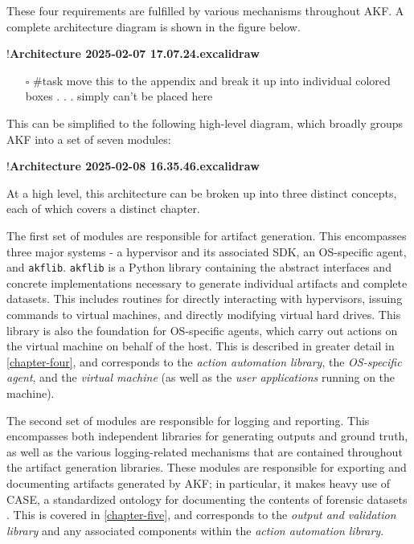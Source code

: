 \documentclass[letterpaper,12pt]{report}
\def\tightlist{}
\newcommand{\passthrough}[1]{#1}
\begin{document}
These four requirements are fulfilled by various mechanisms throughout
AKF. A complete architecture diagram is shown in the figure below.

!\textbf{Architecture 2025-02-07 17.07.24.excalidraw}

\begin{itemize}
\tightlist
\item[$\square$]
  \#task move this to the appendix and break it up into individual
  colored boxes . . . simply can't be placed here
\end{itemize}

This can be simplified to the following high-level diagram, which
broadly groups AKF into a set of seven modules:

!\textbf{Architecture 2025-02-08 16.35.46.excalidraw}

At a high level, this architecture can be broken up into three distinct
concepts, each of which covers a distinct chapter.

The first set of modules are responsible for artifact generation. This
encompasses three major systems - a hypervisor and its associated SDK,
an OS-specific agent, and \passthrough{\lstinline!akflib!}.
\passthrough{\lstinline!akflib!} is a Python library containing the
abstract interfaces and concrete implementations necessary to generate
individual artifacts and complete datasets. This includes routines for
directly interacting with hypervisors, issuing commands to virtual
machines, and directly modifying virtual hard drives. This library is
also the foundation for OS-specific agents, which carry out actions on
the virtual machine on behalf of the host. This is described in greater
detail in \autoref{chapter-four}, and corresponds to the
\emph{action automation library}, the \emph{OS-specific agent}, and the
\emph{virtual machine} (as well as the \emph{user applications} running
on the machine).

The second set of modules are responsible for logging and reporting.
This encompasses both independent libraries for generating outputs and
ground truth, as well as the various logging-related mechanisms that are
contained throughout the artifact generation libraries. These modules
are responsible for exporting and documenting artifacts generated by
AKF; in particular, it makes heavy use of CASE, a standardized ontology
for documenting the contents of forensic datasets
\cite{caseyAdvancingCoordinatedCyberinvestigations2017}. This is
covered in \autoref{chapter-five}, and corresponds to the
\emph{output and validation library} and any associated components
within the \emph{action automation library}.
\end{document}
